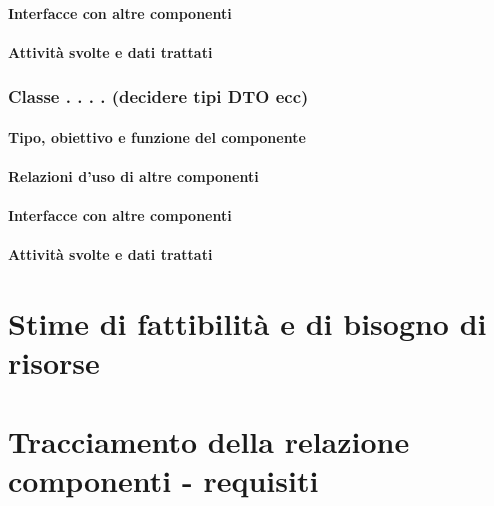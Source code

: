 \subsubsection*{Interfacce con altre componenti}
\subsubsection*{Attivit\`a svolte e dati trattati}

\subsection{Classe . . . .  (decidere tipi DTO ecc)}
\subsubsection*{Tipo, obiettivo e funzione del componente}
\subsubsection*{Relazioni d'uso di altre componenti}
\subsubsection*{Interfacce con altre componenti}
\subsubsection*{Attivit\`a svolte e dati trattati}

\chapter{Stime di fattibilit\`a e di bisogno di risorse}

\chapter{Tracciamento della relazione componenti - requisiti}

\listoftables
{}
\listoffigures
{}

